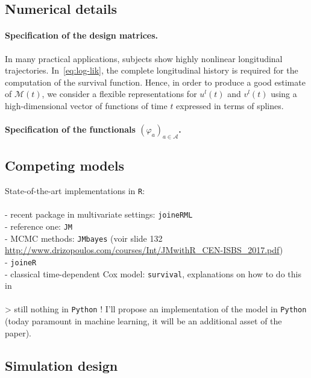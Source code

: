 \documentclass[11pt]{article}
\newcommand{\cM}{\mathcal M}
\newcommand{\cA}{\mathcal A}
\begin{document}
\subsection{Numerical details}
\label{sec:numerical details}

\paragraph{Specification of the design matrices.}
 
In many practical applications, subjects show highly nonlinear longitudinal trajectories. In~\eqref{eq:log-lik}, the complete longitudinal history is required for the computation of the survival function. Hence, in order to produce a good estimate of $\cM(t)$, we consider a flexible representations for $u^l(t)$ and $v^l(t)$ using a high-dimensional vector of functions of time $t$ expressed in terms of splines.

\paragraph{Specification of the functionals $(\varphi_a)_{a\in \cA}$.}


\subsection{Competing models}
\label{sec:competing models}

State-of-the-art implementations in \texttt{R}: \\
\\
- recent package in multivariate settings: \texttt{joineRML}
\citep{hickey2018joinerml} \\
- reference one: \texttt{JM}
\citep{rizopoulos2010jm} \\
- MCMC methods: \texttt{JMbayes} 
\citep{rizopoulos2014r} (voir slide 132 \url{http://www.drizopoulos.com/courses/Int/JMwithR_CEN-ISBS_2017.pdf})\\ 
- \texttt{joineR}
\citep{philipson2018package} \\
- classical time-dependent Cox model: \texttt{survival}, explanations on how to do this in \citet{zhang2018time} \\
\\
> still nothing in \texttt{Python} ! I'll propose an implementation of the model in \texttt{Python} (today paramount in machine learning, it will be an additional asset of the paper).

\subsection{Simulation design}
\label{simulation design}
\end{document}
